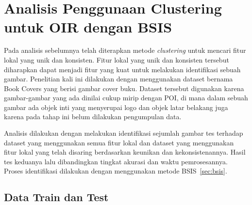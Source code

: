 %

\section{Analisis Penggunaan Clustering untuk OIR dengan BSIS}
\label{sec:analisis_bsis}
Pada analisis sebelumnya telah diterapkan metode \textit{clustering} untuk mencari fitur lokal yang unik dan konsisten. Fitur lokal yang unik dan konsisten tersebut diharapkan dapat menjadi fitur yang kuat untuk melakukan identifikasi sebuah gambar. Penelitian kali ini dilakukan dengan menggunakan dataset bernama Book Covers yang berisi gambar cover buku. Dataset tersebut digunakan karena gambar-gambar yang ada dinilai cukup mirip dengan POI, di mana dalam sebuah gambar ada objek inti yang menyerupai logo dan objek latar belakang juga karena pada tahap ini belum dilakukan pengumpulan data. 

Analisis dilakukan dengan melakukan identifikasi sejumlah gambar tes terhadap dataset yang menggunakan semua fitur lokal dan dataset yang menggunakan fitur lokal yang telah disaring berdasarkan keunikan dan kekonsistenannya. Hasil tes keduanya lalu dibandingkan tingkat akurasi dan waktu pemrosesannya. Proses identifikasi dilakukan dengan menggunakan metode BSIS~\ref{sec:bsis}.

\subsection{Data Train dan Test}
